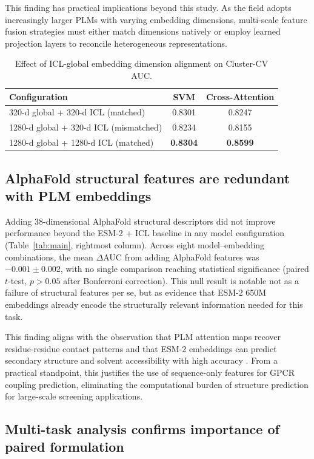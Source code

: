 \documentclass[11pt,a4paper]{article}
\begin{document}
This finding has practical implications beyond this study. As the field adopts increasingly larger PLMs with varying embedding dimensions, multi-scale feature fusion strategies must either match dimensions natively or employ learned projection layers to reconcile heterogeneous representations.

\begin{table}[t]
\centering
\caption{Effect of ICL-global embedding dimension alignment on Cluster-CV AUC.}
\label{tab:dimension}
\begin{tabular}{lcc}
\toprule
Configuration & SVM & Cross-Attention \\
\midrule
320-d global + 320-d ICL (matched)     & 0.8301 & 0.8247 \\
1280-d global + 320-d ICL (mismatched) & 0.8234 & 0.8155 \\
1280-d global + 1280-d ICL (matched)   & \textbf{0.8304} & \textbf{0.8599} \\
\bottomrule
\end{tabular}
\end{table}

\subsection{AlphaFold structural features are redundant with PLM embeddings}

Adding 38-dimensional AlphaFold structural descriptors did not improve performance beyond the ESM-2 + ICL baseline in any model configuration (Table~\ref{tab:main}, rightmost column). Across eight model--embedding combinations, the mean $\Delta$AUC from adding AlphaFold features was $-0.001 \pm 0.002$, with no single comparison reaching statistical significance (paired $t$-test, $p > 0.05$ after Bonferroni correction). This null result is notable not as a failure of structural features per se, but as evidence that ESM-2 650M embeddings already encode the structurally relevant information needed for this task.

This finding aligns with the observation that PLM attention maps recover residue-residue contact patterns \cite{rao2021transformer} and that ESM-2 embeddings can predict secondary structure and solvent accessibility with high accuracy \cite{lin2023evolutionary}. From a practical standpoint, this justifies the use of sequence-only features for GPCR coupling prediction, eliminating the computational burden of structure prediction for large-scale screening applications.

\subsection{Multi-task analysis confirms importance of paired formulation}
\end{document}
